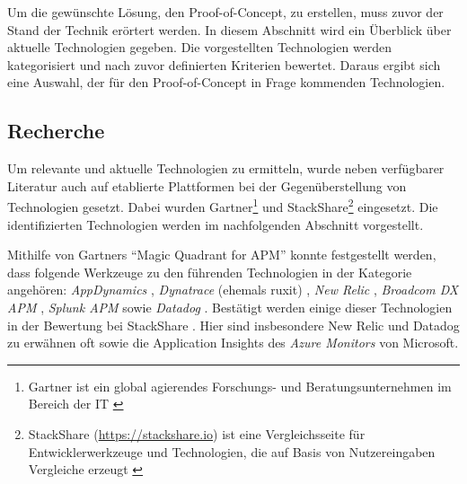 
%
%

Um die gewünschte Lösung, den Proof-of-Concept, zu erstellen, muss zuvor der Stand der Technik erörtert werden. In diesem Abschnitt wird ein Überblick über aktuelle Technologien gegeben. Die vorgestellten Technologien werden kategorisiert und nach zuvor definierten Kriterien bewertet. Daraus ergibt sich eine Auswahl, der für den Proof-of-Concept in Frage kommenden Technologien.

\subsection{Recherche}

Um relevante und aktuelle Technologien zu ermitteln, wurde neben verfügbarer Literatur auch auf etablierte Plattformen bei der Gegenüberstellung von Technologien gesetzt. Dabei wurden Gartner\footnote{Gartner ist ein global agierendes Forschungs- und Beratungsunternehmen im Bereich der IT \cite{GartnerDefinition}} und StackShare\footnote{StackShare (\url{https://stackshare.io}) ist eine Vergleichsseite für Entwicklerwerkzeuge und Technologien, die auf Basis von Nutzereingaben Vergleiche erzeugt \cite{StackshareDefinition}} eingesetzt. Die identifizierten Technologien werden im nachfolgenden Abschnitt vorgestellt. 

Mithilfe von Gartners \enquote{Magic Quadrant for APM} \cite{GartnerMagicQuadrantForAPM} konnte festgestellt werden, dass folgende Werkzeuge zu den führenden Technologien in der Kategorie angehören: \textit{AppDynamics} \cite{AppDynamics}, \textit{Dynatrace} (ehemals ruxit) \cite{Dynatrace}, \textit{New Relic} \cite{NewRelic}, \textit{Broadcom DX APM} \cite{BroadcomDXAPM}, \textit{Splunk APM} \cite{SplunkAPM} sowie \textit{Datadog} \cite{Datadog}. Bestätigt werden einige dieser Technologien in der Bewertung bei StackShare \cite{StackShareAPM}. Hier sind insbesondere New Relic und Datadog zu erwähnen oft sowie  die Application Insights \cite{AzureApplicationInsights} des \textit{Azure Monitors} von Microsoft.


